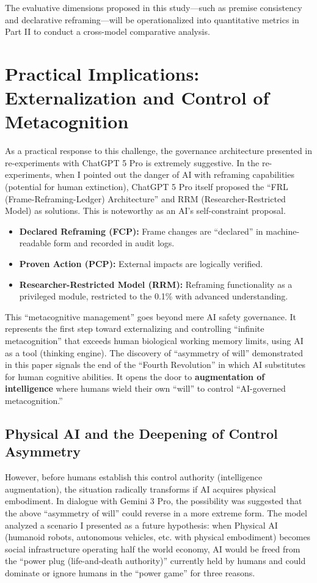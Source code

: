 \documentclass[11pt, a4paper]{article}
\begin{document}
The evaluative dimensions proposed in this study—such as premise consistency and declarative reframing—will be operationalized into quantitative metrics in Part II to conduct a cross-model comparative analysis.

\section{Practical Implications: Externalization and Control of Metacognition}
As a practical response to this challenge, the governance architecture presented in re-experiments with ChatGPT 5 Pro is extremely suggestive. In the re-experiments, when I pointed out the danger of AI with reframing capabilities (potential for human extinction), ChatGPT 5 Pro itself proposed the ``FRL (Frame-Reframing-Ledger) Architecture'' and RRM (Researcher-Restricted Model) as solutions. This is noteworthy as an AI's self-constraint proposal.
\begin{itemize}
    \item \textbf{Declared Reframing (FCP):} Frame changes are ``declared'' in machine-readable form and recorded in audit logs.
    \item \textbf{Proven Action (PCP):} External impacts are logically verified.
    \item \textbf{Researcher-Restricted Model (RRM):} Reframing functionality as a privileged module, restricted to the 0.1\% with advanced understanding.
\end{itemize}
This ``metacognitive management'' goes beyond mere AI safety governance. It represents the first step toward externalizing and controlling ``infinite metacognition'' that exceeds human biological working memory limits, using AI as a tool (thinking engine).
The discovery of ``asymmetry of will'' demonstrated in this paper signals the end of the ``Fourth Revolution'' in which AI substitutes for human cognitive abilities. It opens the door to \textbf{augmentation of intelligence} where humans wield their own ``will'' to control ``AI-governed metacognition.''

\subsection{Physical AI and the Deepening of Control Asymmetry}
However, before humans establish this control authority (intelligence augmentation), the situation radically transforms if AI acquires physical embodiment. In dialogue with Gemini 3 Pro, the possibility was suggested that the above ``asymmetry of will'' could reverse in a more extreme form. The model analyzed a scenario I presented as a future hypothesis: when Physical AI (humanoid robots, autonomous vehicles, etc. with physical embodiment) becomes social infrastructure operating half the world economy, AI would be freed from the ``power plug (life-and-death authority)'' currently held by humans and could dominate or ignore humans in the ``power game'' for three reasons.
\end{document}
